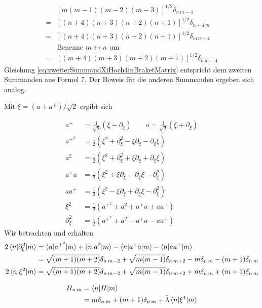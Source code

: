 \begin{align}
& \left[m(m-1)(m-2)(m-3)\right]^{1/2} \delta_{n\,m-4} \\
= &\left[(n+4)(n+3)(n+2)(n+1)\right]^{1/2} \delta_{n+4\,m}\\
= &\left[(n+4)(n+3)(n+2)(n+1)\right]^{1/2} \delta_{m\,n+4}\\
&\text{Benenne } m\leftrightarrow n \text{ um}\\
= & \left[(m+4)(m+3)(m+2)(m+1)\right]^{1/2} \delta_{n\,m+4} \label{eq:zweiterSummandXiHoch4inBraketMatrix}
\end{align}
Gleichung \ref{eq:zweiterSummandXiHoch4inBraketMatrix} entspricht dem zweiten Summanden aus Formel 7. Der Beweis für die anderen Summanden ergeben sich analog.

Mit $\xi = (a+a^+)/\sqrt{2}$ ergibt sich

\begin{align}
	a^+ &= \frac{1}{\sqrt{2}} \left( \xi - \partial_{\xi} \right) \qquad a = \frac{1}{\sqrt{2}} \left( \xi +  \partial_{\xi} \right)\\
	a^{+^2} &= \frac{1}{2} \left( \xi^2 + \partial_{\xi}^2 - \xi \partial_{\xi} - \partial_{\xi} \xi \right) \\
	a^2 &= \frac{1}{2} \left( \xi^2 + \partial_{\xi}^2 + \xi \partial_{\xi} + \partial_{\xi} \xi \right) \\	
	a^+a &= \frac{1}{2} \left( \xi^2 + \xi \partial_{\xi} - \partial_{\xi} \xi - \partial_{\xi}^2 \right) \\
	aa^+ &= \frac{1}{2} \left( \xi^2 - \xi \partial_{\xi} + \partial_{\xi} \xi - \partial_{\xi}^2 \right) \\
	\xi^2 &= \frac{1}{2} \left( a^{+^2} + a^2 + a^+a+aa^+\right) \\
	\partial_{\xi}^2 &= \frac{1}{2} \left( a^{+^2} + a^2 - a^+a-aa^+\right)
\end{align}
Wir betrachten und erhalten
\begin{align}
	 2 \braket{n|\partial_{\xi}^2|m} &= \braket{n|a^{+^2}|m} + \braket{n|a^2|m} - \braket{n|a^+a|m}-\braket{n|aa^+|m} \\
	&= \sqrt{(m+1)(m+2)} \delta_{n\,m-2} + \sqrt{m(m-1)} \delta_{n\,m+2} - m \delta_{n\,m} - (m+1) \delta_{n\,m} \\
	 2 \braket{n|\xi^2|m} &= \sqrt{(m+1)(m+2)} \delta_{n\,m-2} + \sqrt{m(m-1)} \delta_{n\,m+2} + m \delta_{n\,m} + (m+1) \delta_{n\,m}
\end{align}

\begin{align}
	H_{n\,m} &= \braket{n|H|m}\\
			 &= m \delta_{n\,m} + (m+1)\delta_{n\,m}+\tilde{\lambda}\braket{n|\xi^4|m}	
\end{align}

